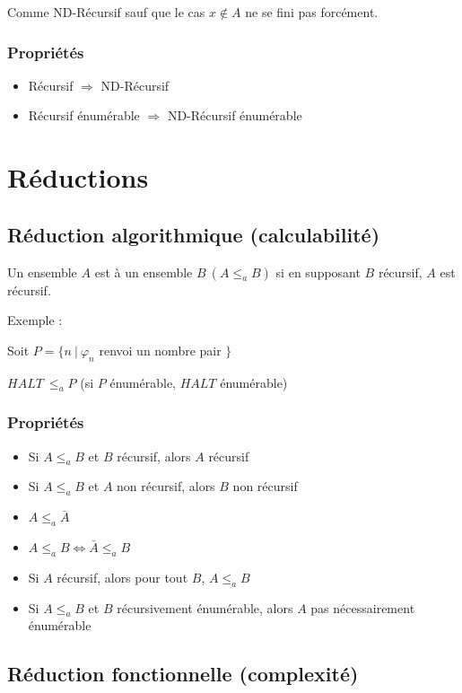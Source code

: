 Comme ND-Récursif sauf que le cas $x \notin A$ ne se fini pas forcément.

\subsection{Propriétés}

\begin{itemize}
\item Récursif $\Rightarrow$ ND-Récursif
\item Récursif énumérable $\Rightarrow$ ND-Récursif énumérable
\end{itemize}

\chapter{Réductions}

\section{Réduction algorithmique (calculabilité)}

Un ensemble $A$ est  à un ensemble $B \ (A \leq_a B)$ si en supposant $B$ récursif, $A$ est récursif.

Exemple :

Soit $P = \{n \ | \ \varphi_n$ renvoi un nombre pair $\}$

$HALT \ \leq_a P$ (si $P$ énumérable, $HALT$ énumérable)

\subsection{Propriétés}

\begin{itemize}
\item Si $A \leq_a B$ et $B$ récursif, alors $A$ récursif
\item Si $A \leq_a B$ et $A$ non récursif, alors $B$ non récursif
\item $A \leq_a \bar{A}$
\item $A \leq_a B \Leftrightarrow \bar{A} \leq_a B$
\item Si $A$ récursif, alors pour tout $B$, $A \leq_a B$
\item Si $A \leq_a B$ et $B$ récursivement énumérable, alors $A$ pas nécessairement énumérable
\end{itemize}

\section{Réduction fonctionnelle (complexité)}

